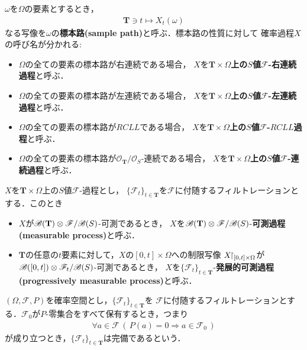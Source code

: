 	$\omega$を$\Omega$の要素とするとき，
	\begin{align}
		\mathbf{T} \ni t \longmapsto X_t(\omega)
	\end{align}
	なる写像を$\omega$の{\bf 標本路}{\bf (sample path)}と呼ぶ．標本路の性質に対して
	確率過程$X$の呼び名が分かれる:
	\begin{itemize}
		\item $\Omega$の全ての要素の標本路が右連続である場合，
			$X$を{\bf $\mathbf{T} \times \Omega$上の$S$値$\mathscr{F}$-右連続過程}と呼ぶ．
		\item $\Omega$の全ての要素の標本路が左連続である場合，
			$X$を{\bf $\mathbf{T} \times \Omega$上の$S$値$\mathscr{F}$-左連続過程}と呼ぶ．
		\item $\Omega$の全ての要素の標本路が$RCLL$である場合，
			$X$を{\bf $\mathbf{T} \times \Omega$上の$S$値$\mathscr{F}$-$RCLL$過程}と呼ぶ．
		\item $\Omega$の全ての要素の標本路が$\mathscr{O}_{\mathbf{T}}/\mathscr{O}_{S}$-連続である場合，
			$X$を{\bf $\mathbf{T} \times \Omega$上の$S$値$\mathscr{F}$-連続過程}と呼ぶ．
	\end{itemize}
	
	$X$を$\mathbf{T} \times \Omega$上の$S$値$\mathscr{F}$-過程とし，
	$\{\mathscr{F}_t\}_{t \in \mathbf{T}}$を$\mathscr{F}$に付随するフィルトレーションとする．このとき
	\begin{itemize}
		\item $X$が$\mathscr{B}(\mathbf{T}) \otimes \mathscr{F}/\mathscr{B}(S)$-可測であるとき，
			$X$を$\mathscr{B}(\mathbf{T}) \otimes \mathscr{F}/\mathscr{B}(S)$-{\bf 可測過程}
			{\bf (measurable process)}と呼ぶ．
		\item $\mathbf{T}$の任意の$t$要素に対して，$X$の$[0,t] \times \Omega$への制限写像
			$X\hspace{-0.41em}\upharpoonright_{[0,t] \times \Omega}$が$\mathscr{B}([0,t]) \otimes \mathscr{F}_t/\mathscr{B}(S)$-可測であるとき，
			$X$を$\{\mathscr{F}_t\}_{t \in \mathbf{T}}$-{\bf 発展的可測過程}
			{\bf (progressively measurable process)}と呼ぶ．
	\end{itemize}
	
	\begin{screen}
		\begin{dfn}[フィルトレーションの完備性]\label{thm:completeness_of_filtration}
			$(\Omega,\mathscr{F},P)$を確率空間とし，$\{\mathscr{F}_t\}_{t \in \mathbf{T}}$を
			$\mathscr{F}$に付随するフィルトレーションとする．$\mathscr{F}_{0}$が$P$-零集合をすべて保有するとき，つまり
			\begin{align}
				\forall a \in \mathscr{F}\, \left(\, P(a) = 0 \Longrightarrow a \in \mathscr{F}_{0}\, \right)
			\end{align}
			が成り立つとき，$\{\mathscr{F}_t\}_{t \in \mathbf{T}}$は完備であるという．
		\end{dfn}
	\end{screen}
	
